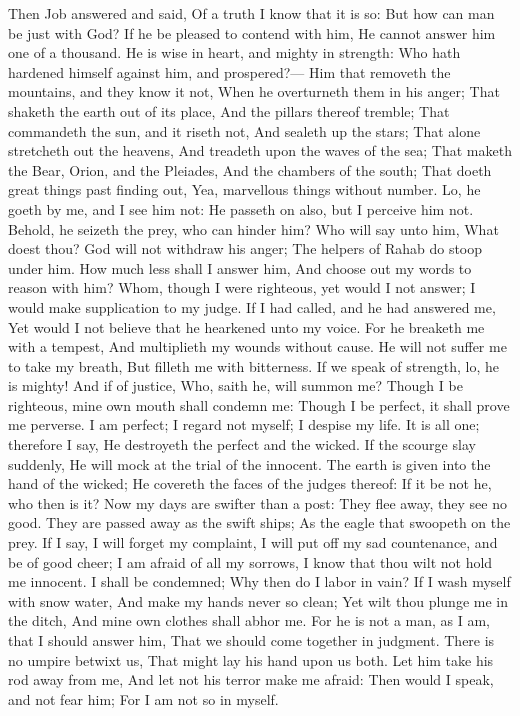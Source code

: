 Then Job answered and said,  Of a truth I know that it is so: But how can man be just with God?  If he be pleased to contend with him, He cannot answer him one of a thousand.  He is wise in heart, and mighty in strength: Who hath hardened himself against him, and prospered?—  Him that removeth the mountains, and they know it not, When he overturneth them in his anger;  That shaketh the earth out of its place, And the pillars thereof tremble;  That commandeth the sun, and it riseth not, And sealeth up the stars;  That alone stretcheth out the heavens, And treadeth upon the waves of the sea;  That maketh the Bear, Orion, and the Pleiades, And the chambers of the south;  That doeth great things past finding out, Yea, marvellous things without number.  Lo, he goeth by me, and I see him not: He passeth on also, but I perceive him not.  Behold, he seizeth the prey, who can hinder him? Who will say unto him, What doest thou?  God will not withdraw his anger; The helpers of Rahab do stoop under him.  How much less shall I answer him, And choose out my words to reason with him?  Whom, though I were righteous, yet would I not answer; I would make supplication to my judge.  If I had called, and he had answered me, Yet would I not believe that he hearkened unto my voice.  For he breaketh me with a tempest, And multiplieth my wounds without cause.  He will not suffer me to take my breath, But filleth me with bitterness.  If we speak of strength, lo, he is mighty! And if of justice, Who, saith he, will summon me?  Though I be righteous, mine own mouth shall condemn me: Though I be perfect, it shall prove me perverse.  I am perfect; I regard not myself; I despise my life.  It is all one; therefore I say, He destroyeth the perfect and the wicked.  If the scourge slay suddenly, He will mock at the trial of the innocent.  The earth is given into the hand of the wicked; He covereth the faces of the judges thereof: If it be not he, who then is it?  Now my days are swifter than a post: They flee away, they see no good.  They are passed away as the swift ships; As the eagle that swoopeth on the prey.  If I say, I will forget my complaint, I will put off my sad countenance, and be of good cheer;  I am afraid of all my sorrows, I know that thou wilt not hold me innocent.  I shall be condemned; Why then do I labor in vain?  If I wash myself with snow water, And make my hands never so clean;  Yet wilt thou plunge me in the ditch, And mine own clothes shall abhor me.  For he is not a man, as I am, that I should answer him, That we should come together in judgment.  There is no umpire betwixt us, That might lay his hand upon us both.  Let him take his rod away from me, And let not his terror make me afraid:  Then would I speak, and not fear him; For I am not so in myself. 

